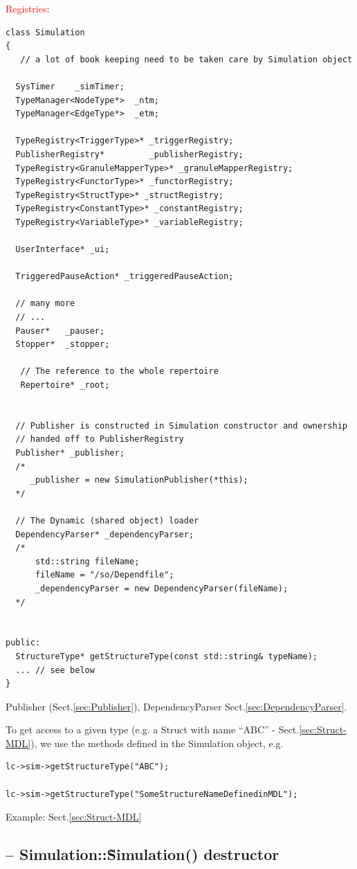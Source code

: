 \textcolor{red}{Registries}:
\begin{verbatim}
class Simulation
{
   // a lot of book keeping need to be taken care by Simulation object
   
  SysTimer    _simTimer;
  TypeManager<NodeType*>  _ntm;
  TypeManager<EdgeType*>  _etm;
   
  TypeRegistry<TriggerType>* _triggerRegistry;
  PublisherRegistry*         _publisherRegistry;
  TypeRegistry<GranuleMapperType>* _granuleMapperRegistry;
  TypeRegistry<FunctorType>* _functorRegistry;
  TypeRegistry<StructType>* _structRegistry;
  TypeRegistry<ConstantType>* _constantRegistry;
  TypeRegistry<VariableType>* _variableRegistry;

  UserInterface* _ui;

  TriggeredPauseAction* _triggeredPauseAction;
                                                 
  // many more
  // ...
  Pauser*   _pauser;
  Stopper*  _stopper;
   
   // The reference to the whole repertoire
   Repertoire* _root;
   

  // Publisher is constructed in Simulation constructor and ownership
  // handed off to PublisherRegistry
  Publisher* _publisher;
  /*
     _publisher = new SimulationPublisher(*this);
  */

  // The Dynamic (shared object) loader
  DependencyParser* _dependencyParser;
  /*  
      std::string fileName;
      fileName = "/so/Dependfile";
      _dependencyParser = new DependencyParser(fileName);
  */  
  
  
public:
  StructureType* getStructureType(const std::string& typeName);
  ... // see below  
}
\end{verbatim}
Publisher (Sect.\ref{sec:Publisher}), DependencyParser Sect.\ref{sec:DependencyParser}.

To get access to a given type (e.g. a Struct with name ``ABC'' -
Sect.\ref{sec:Struct-MDL}), we use the methods defined in the Simulation object, e.g.
\begin{verbatim}
lc->sim->getStructureType("ABC");

lc->sim->getStructureType("SomeStructureNameDefinedinMDL");
\end{verbatim}
Example: Sect.\ref{sec:Struct-MDL}

\subsection{-- Simulation::\~Simulation() destructor}

